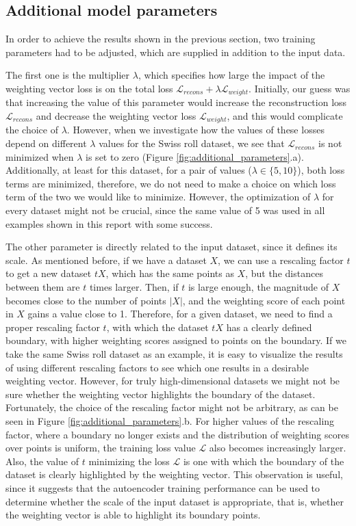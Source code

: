 \documentclass{article}
\begin{document}
\subsection{Additional model parameters}

In order to achieve the results shown in the previous section, two training parameters had to be adjusted, which are supplied in addition to the input data.

The first one is the multiplier $\lambda$, which specifies how large the impact of the weighting vector loss is on the total loss $\mathcal{L}_{recons} + \lambda \mathcal{L}_{weight}$. Initially, our guess was that increasing the value of this parameter would increase the reconstruction loss $\mathcal{L}_{recons}$ and decrease the weighting vector loss $\mathcal{L}_{weight}$, and this would complicate the choice of $\lambda$. However, when we investigate how the values of these losses depend on different $\lambda$ values for the Swiss roll dataset, we see that $\mathcal{L}_{recons}$ is not minimized when $\lambda$ is set to zero (Figure \ref{fig:additional_parameters}.a). Additionally, at least for this dataset, for a pair of values ($\lambda \in \{5, 10\}$), both loss terms are minimized, therefore, we do not need to make a choice on which loss term of the two we would like to minimize. However, the optimization of $\lambda$ for every dataset might not be crucial, since the same value of 5 was used in all examples shown in this report with some success.

The other parameter is directly related to the input dataset, since it defines its scale. As mentioned before, if we have a dataset $X$, we can use a rescaling factor $t$ to get a new dataset $tX$, which has the same points as $X$, but the distances between them are $t$ times larger. Then, if $t$ is large enough, the magnitude of $X$ becomes close to the number of points $|X|$, and the weighting score of each point in $X$ gains a value close to 1. Therefore, for a given dataset, we need to find a proper rescaling factor $t$, with which the dataset $tX$ has a clearly defined boundary, with higher weighting scores assigned to points on the boundary. If we take the same Swiss roll dataset as an example, it is easy to visualize the results of using different rescaling factors to see which one results in a desirable weighting vector. However, for truly high-dimensional datasets we might not be sure whether the weighting vector highlights the boundary of the dataset. Fortunately, the choice of the rescaling factor might not be arbitrary, as can be seen in Figure \ref{fig:additional_parameters}.b. For higher values of the rescaling factor, where a boundary no longer exists and the distribution of weighting scores over points is uniform, the training loss value $\mathcal{L}$ also becomes increasingly larger. Also, the value of $t$ minimizing the loss $\mathcal{L}$ is one with which the boundary of the dataset is clearly highlighted by the weighting vector. This observation is useful, since it suggests that the autoencoder training performance can be used to determine whether the scale of the input dataset is appropriate, that is, whether the weighting vector is able to highlight its boundary points.
\end{document}

